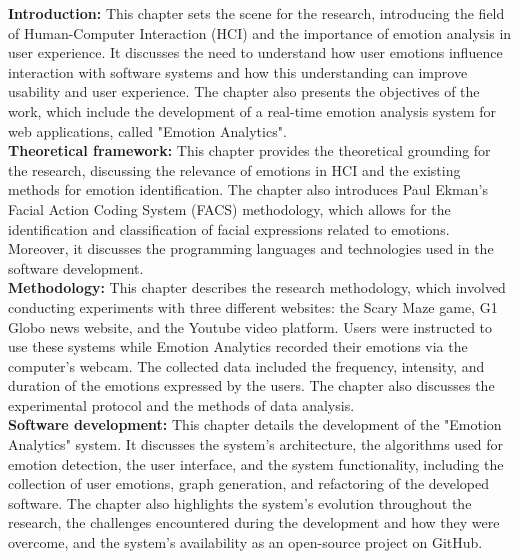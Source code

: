 \begin{english-abstract}

  \textbf{Introduction:} This chapter sets the scene for the research, introducing the field of Human-Computer Interaction (HCI) and the importance of emotion analysis in user experience. It discusses the need to understand how user emotions influence interaction with software systems and how this understanding can improve usability and user experience. The chapter also presents the objectives of the work, which include the development of a real-time emotion analysis system for web applications, called "Emotion Analytics".
  \\

  \textbf{Theoretical framework:} This chapter provides the theoretical grounding for the research, discussing the relevance of emotions in HCI and the existing methods for emotion identification. The chapter also introduces Paul Ekman's Facial Action Coding System (FACS) methodology, which allows for the identification and classification of facial expressions related to emotions. Moreover, it discusses the programming languages and technologies used in the software development.
  \\

  \textbf{Methodology:} This chapter describes the research methodology, which involved conducting experiments with three different websites: the Scary Maze game, G1 Globo news website, and the Youtube video platform. Users were instructed to use these systems while Emotion Analytics recorded their emotions via the computer's webcam. The collected data included the frequency, intensity, and duration of the emotions expressed by the users. The chapter also discusses the experimental protocol and the methods of data analysis.
  \\

  \textbf{Software development:} This chapter details the development of the "Emotion Analytics" system. It discusses the system's architecture, the algorithms used for emotion detection, the user interface, and the system functionality, including the collection of user emotions, graph generation, and refactoring of the developed software. The chapter also highlights the system's evolution throughout the research, the challenges encountered during the development and how they were overcome, and the system's availability as an open-source project on GitHub.
  \pagebreak


\end{english-abstract}
